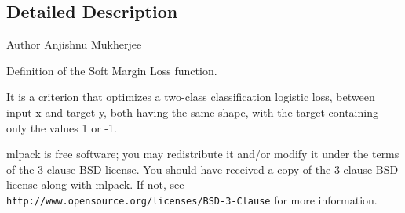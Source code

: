 \subsection{Detailed Description}
\begin{DoxyAuthor}{Author}
Anjishnu Mukherjee
\end{DoxyAuthor}
Definition of the Soft Margin Loss function.

It is a criterion that optimizes a two-\/class classification logistic loss, between input x and target y, both having the same shape, with the target containing only the values 1 or -\/1.

mlpack is free software; you may redistribute it and/or modify it under the terms of the 3-\/clause B\+SD license. You should have received a copy of the 3-\/clause B\+SD license along with mlpack. If not, see {\tt http\+://www.\+opensource.\+org/licenses/\+B\+S\+D-\/3-\/\+Clause} for more information. 